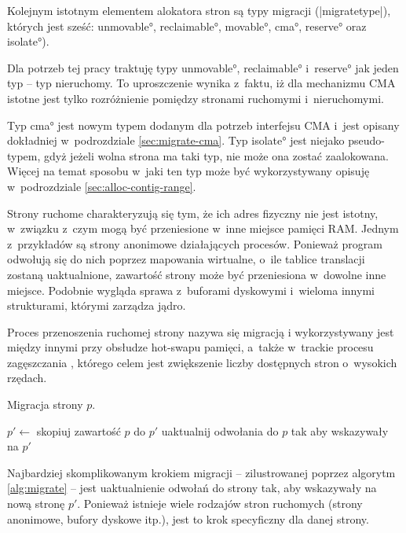Kolejnym istotnym elementem alokatora stron są typy migracji
(\code|migratetype|), których jest sześć: \ang*{unmovable},
\ang*{reclaimable}, \ang*{movable}, \ang*{cma}, \ang*{reserve} oraz
\ang*{isolate}).

Dla potrzeb tej pracy traktuję typy \ang*{unmovable},
\ang*{reclaimable} i~\ang*{reserve} jak jeden typ -- typ nieruchomy.
To uproszczenie wynika z~faktu, iż dla mechanizmu CMA istotne jest
tylko rozróżnienie pomiędzy stronami ruchomymi i~nieruchomymi.

Typ \ang*{cma} jest nowym typem dodanym dla potrzeb interfejsu CMA
i~jest opisany dokładniej w~podrozdziale \ref{sec:migrate-cma}.  Typ
\ang*{isolate} jest niejako pseudo-typem, gdyż jeżeli wolna strona ma
taki typ, nie może ona zostać zaalokowana.  Więcej na temat sposobu
w~jaki ten typ może być wykorzystywany opisuję w~podrozdziale
\ref{sec:alloc-contig-range}.

Strony ruchome charakteryzują się tym, że ich adres fizyczny nie jest
istotny, w~związku z~czym mogą być przeniesione w~inne miejsce pamięci
RAM.  Jednym z~przykładów są strony anonimowe działających procesów.
Ponieważ program odwołują się do nich poprzez mapowania wirtualne,
o~ile tablice translacji zostaną uaktualnione, zawartość strony może
być przeniesiona w~dowolne inne miejsce.  Podobnie wygląda sprawa
z~buforami dyskowymi i~wieloma innymi strukturami, którymi zarządza
jądro.

Proces przenoszenia ruchomej strony nazywa się migracją
i wykorzystywany jest między innymi przy obsłudze hot-swapu pamięci,
a~także w~trackie procesu zagęszczania \autocite{bib:compaction,
  bib:supporting-large-contig-regions}, którego celem jest zwiększenie
liczby dostępnych stron o~wysokich rzędach.

\begin{algorithm}
\caption[Migracja strony.]{Migracja strony $p$.}
\label{alg:migrate}
\begin{algorithmic}[1]
    \State $p' \gets$ 
    \State skopiuj zawartość $p$ do $p'$
    \State uaktualnij odwołania do $p$ tak aby wskazywały na $p'$
    \State {}
\EndProcedure
\end{algorithmic}
\end{algorithm}

Najbardziej skomplikowanym krokiem migracji -- zilustrowanej poprzez
algorytm \ref{alg:migrate} -- jest uaktualnienie odwołań do strony
tak, aby wskazywały na nową stronę $p'$.  Ponieważ istnieje wiele
rodzajów stron ruchomych (strony anonimowe, bufory dyskowe itp.), jest
to krok specyficzny dla danej strony.

